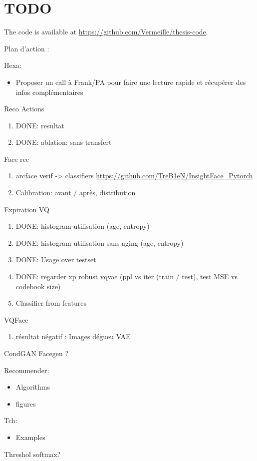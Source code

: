 \chapter{TODO}

The code is available at \url{https://github.com/Vermeille/thesis-code}.

Plan d'action :

Hexa:
\begin{itemize}
    \item Proposer un call à Frank/PA pour faire une lecture rapide et récupérer des infos complémentaires

\end{itemize}

Reco Actions
\begin{enumerate}
    \item DONE: resultat
    \item DONE: ablation: sans transfert
\end{enumerate}

Face rec
\begin{enumerate}
    \item arcface verif -> classifiers \url{https://github.com/TreB1eN/InsightFace_Pytorch}
    
    \item Calibration: avant / après, distribution
\end{enumerate}

Expiration VQ
\begin{enumerate}
    \item DONE: histogram utilisation (age, entropy)
    \item DONE: histogram utilisation sans aging (age, entropy)
    \item DONE: Usage over testset
    \item DONE: regarder xp robust vqvae (ppl vs iter (train / test), test MSE vs codebook size)
    \item Classifier from features
\end{enumerate}

VQFace
\begin{enumerate}
    \item résultat négatif : Images dégueu VAE
\end{enumerate}

CondGAN Facegen ?

Recommender:
\begin{itemize}
    \item Algorithms
    \item figures
\end{itemize}

Tch:
\begin{itemize}
    \item Examples
\end{itemize}

Threshol softmax?